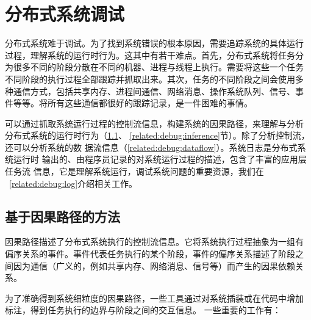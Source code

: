
\section{分布式系统调试}

分布式系统难于调试。为了找到系统错误的根本原因，需要追踪系统的具体运行
过程，理解系统的运行时行为。这其中有若干难点。首先，分布式系统将任务分
为很多不同的阶段分散在不同的机器、进程与线程上执行。需要将这些一个任务
不同阶段的执行过程全部跟踪并抓取出来。其次，任务的不同阶段之间会使用多
种通信方式，包括共享内存、进程间通信、网络消息、操作系统队列、信号、事
件等等。将所有这些通信都很好的跟踪记录，是一件困难的事情。

% 
% 
% 

可以通过抓取系统运行过程的控制流信息，构建系统的因果路径，来理解与分析
分布式系统的运行时行为（\ref{related:debug:casual}、
\ref{related:debug:inference}节）。除了分析控制流，还可以分析系统的数
据流信息（\ref{related:debug:dataflow}）。系统日志是分布式系统运行时
输出的、由程序员记录的对系统运行过程的描述，包含了丰富的应用层任务流
信息，它是理解系统运行，调试系统问题的重要资源，我们在
~\ref{related:debug:log}介绍相关工作。

\subsection{基于因果路径的方法}
\label{related:debug:casual}

因果路径描述了分布式系统执行的控制流信息。它将系统执行过程抽象为一组有
偏序关系的事件。事件代表任务执行的某个阶段，事件的偏序关系描述了阶段之
间因为通信（广义的，例如共享内存、网络消息、信号等）而产生的因果依赖关
系。

为了准确得到系统细粒度的因果路径，一些工具通过对系统插装或在代码中增加
标注，得到任务执行的边界与阶段之间的交互信息。
一些重要的工作有：

% 
% 
% 
% 
% 

